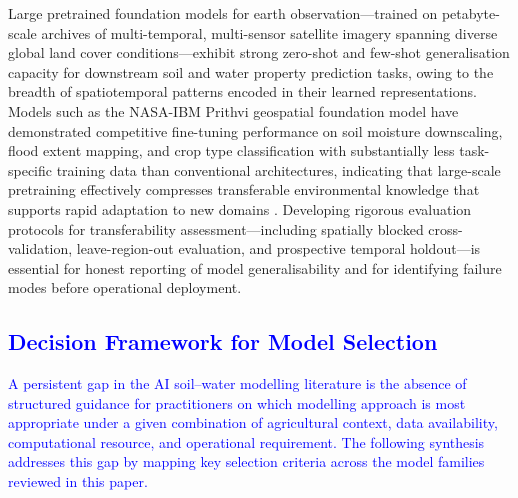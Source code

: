 \documentclass[land,article,submit,pdftex,moreauthors]{Definitions/mdpi}
\numberwithin{equation}{section}
\begin{document}
Large pretrained foundation models for earth observation---trained on petabyte-scale archives of multi-temporal, multi-sensor satellite imagery spanning diverse global land cover conditions---exhibit strong zero-shot and few-shot generalisation capacity for downstream soil and water property prediction tasks, owing to the breadth of spatiotemporal patterns encoded in their learned representations. Models such as the NASA-IBM Prithvi geospatial foundation model have demonstrated competitive fine-tuning performance on soil moisture downscaling, flood extent mapping, and crop type classification with substantially less task-specific training data than conventional architectures, indicating that large-scale pretraining effectively compresses transferable environmental knowledge that supports rapid adaptation to new domains \citep{jakubik2023foundation}. Developing rigorous evaluation protocols for transferability assessment---including spatially blocked cross-validation, leave-region-out evaluation, and prospective temporal holdout---is essential for honest reporting of model generalisability and for identifying failure modes before operational deployment.


\subsection{\textcolor{blue}{Decision Framework for Model Selection}}

\textcolor{blue}{A persistent gap in the AI soil--water modelling literature is the absence of structured guidance for practitioners on which modelling approach is most appropriate under a given combination of agricultural context, data availability, computational resource, and operational requirement. The following synthesis addresses this gap by mapping key selection criteria across the model families reviewed in this paper.}
\end{document}
